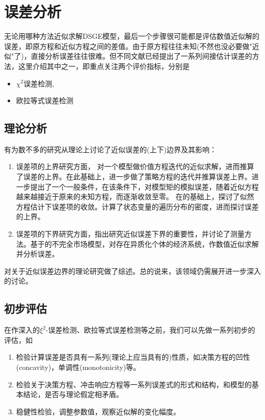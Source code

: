 \chapter{误差分析}
\label{sec:error-analysis}
无论用哪种方法近似求解DSGE模型，最后一个步骤很可能都是评估数值近似解的误差，即原方程和近似方程之间的差值。由于原方程往往未知(不然也没必要做"近似"了)，直接分析误差往往很难。但不同文献已经提出了一系列间接估计误差的方法，这里介绍其中之一\citep{Aruoba:2006cz}，即重点关注两个评价指标，分别是
\begin{itemize}
  \item $\chi^{2}$误差检测\citep{denHaan:1994ej},
  \item 欧拉等式误差检测\cite{Judd:1992gs}
\end{itemize}

\section{理论分析}
\label{sec:error-theoretical-analysis}
有为数不多的研究从理论上讨论了近似误差的(上下)边界及其影响：
\begin{enumerate}

\item 误差项的上界研究方面，\cite{Santos:1998de} 对一个模型做价值方程迭代的近似求解，进而推算了误差的上界。在此基础上，\cite{Santos:2006fz}进一步做了策略方程的迭代并推算误差上界。\cite{Santos:2005dz}进一步提出了一个一般条件，在该条件下，对模型矩的模拟误差，随着近似方程越来越接近于原来的未知方程，而逐渐收敛至零。
\cite{FernandezVillaverde:2006fl}在\cite{Santos:2005dz}的基础上，探讨了似然方程估计下误差项的收敛。\cite{Stachurski:2008dt}计算了状态变量的遍历分布的密度，进而探讨误差的上界。

\item 误差项的下界研究方面，\cite{Judd:2014ce}指出研究近似误差下界的重要性，并讨论了测量方法。\cite{Kogan:2014vf}基于\cite{Krusell:1998cl}的不完全市场模型，对存在异质化个体的经济系统，作数值近似求解并分析误差。
\end{enumerate}

\cite{PeraltaAlva:2014cn}对关于近似误差边界的理论研究做了综述。总的说来，该领域仍需展开进一步深入的讨论。

\section{初步评估}
在作深入的$\xi^{2}$-误差检测、欧拉等式误差检测等之前，我们可以先做一系列初步的评估，如
\begin{enumerate}
  \item 检验计算误差是否具有一系列(理论上应当具有的)性质，如决策方程的凹性(concavity)，单调性(monotonicity)等。
  \item 检验关于决策方程、冲击响应方程等一系列误差式的形式和结构，和模型的基本结论，是否与理论假定相矛盾。
  \item 稳健性检验，调整参数值，观察近似解的变化幅度。
\end{enumerate}

